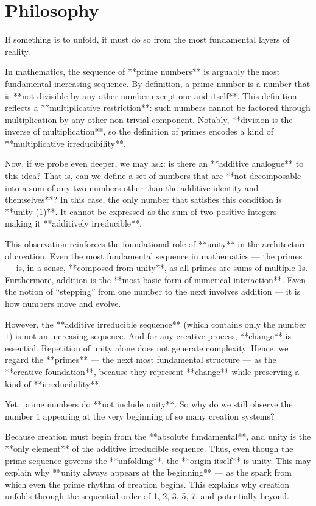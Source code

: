 \section{Philosophy}

If something is to unfold, it must do so from the most fundamental layers of reality.

In mathematics, the sequence of **prime numbers** is arguably the most fundamental increasing sequence. By definition, a prime number is a number that is **not divisible by any other number except one and itself**. This definition reflects a **multiplicative restriction**: such numbers cannot be factored through multiplication by any other non-trivial component. Notably, **division is the inverse of multiplication**, so the definition of primes encodes a kind of **multiplicative irreducibility**.

Now, if we probe even deeper, we may ask: is there an **additive analogue** to this idea? That is, can we define a set of numbers that are **not decomposable into a sum of any two numbers other than the additive identity and themselves**? In this case, the only number that satisfies this condition is **unity ($1$)**. It cannot be expressed as the sum of two positive integers — making it **additively irreducible**.

This observation reinforces the foundational role of **unity** in the architecture of creation. Even the most fundamental sequence in mathematics — the primes — is, in a sense, **composed from unity**, as all primes are sums of multiple $1$s. Furthermore, addition is the **most basic form of numerical interaction**. Even the notion of “stepping” from one number to the next involves addition — it is how numbers move and evolve.

However, the **additive irreducible sequence** (which contains only the number $1$) is not an increasing sequence. And for any creative process, **change** is essential. Repetition of unity alone does not generate complexity. Hence, we regard the **primes** — the next most fundamental structure — as the **creative foundation**, because they represent **change** while preserving a kind of **irreducibility**.

Yet, prime numbers do **not include unity**. So why do we still observe the number $1$ appearing at the very beginning of so many creation systems?

Because creation must begin from the **absolute fundamental**, and unity is the **only element** of the additive irreducible sequence. Thus, even though the prime sequence governs the **unfolding**, the **origin itself** is unity. This may explain why **unity always appears at the beginning** — as the spark from which even the prime rhythm of creation begins.
This explains why creation unfolds through the sequential order of 1, 2, 3, 5, 7, and potentially beyond.


